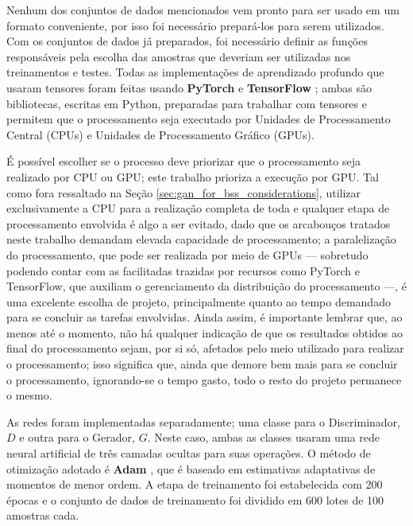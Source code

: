 Nenhum dos conjuntos de dados mencionados vem pronto para ser usado em um formato conveniente, por isso foi necessário prepará-los para serem utilizados. Com os conjuntos de dados já preparados, foi necessário definir as funções responsáveis pela escolha das amostras que deveriam ser utilizadas nos treinamentos e testes. Todas as implementações de aprendizado profundo que usaram tensores foram feitas usando \textbf{PyTorch} \citep{paszke2017pytorch} e \textbf{TensorFlow} \citep{abadi2016tensorflow}; ambas são bibliotecas, escritas em Python, preparadas para trabalhar com tensores e permitem que o processamento seja executado por Unidades de Processamento Central (CPUs) e Unidades de Processamento Gráfico (GPUs).

É possível escolher se o processo deve priorizar que o processamento seja realizado por CPU ou GPU; este trabalho prioriza a execução por GPU. Tal como fora ressaltado na Seção \ref{sec:gan_for_bss_considerations}, utilizar exclusivamente a CPU para a realização completa de toda e qualquer etapa de processamento envolvida é algo a ser evitado, dado que os arcabouços tratados neste trabalho demandam elevada capacidade de processamento; a paralelização do processamento, que pode ser realizada por meio de GPUs --- sobretudo podendo contar com as facilitadas trazidas por recursos como PyTorch e TensorFlow, que auxiliam o gerenciamento da distribuição do processamento ---, é uma excelente escolha de projeto, principalmente quanto ao tempo demandado para se concluir as tarefas envolvidas. Ainda assim, é importante lembrar que, ao menos até o momento, não há qualquer indicação de que os resultados obtidos ao final do processamento sejam, por si só, afetados pelo meio utilizado para realizar o processamento; isso significa que, ainda que demore bem mais para se concluir o processamento, ignorando-se o tempo gasto, todo o resto do projeto permanece o mesmo.

As redes foram implementadas separadamente; uma classe para o Discriminador, $D$ e outra para o Gerador, $G$. Neste caso, ambas as classes usaram uma rede neural artificial de três camadas ocultas para suas operações. O método de otimização adotado é \textbf{Adam} \citep{kingma2014adam}, que é baseado em estimativas adaptativas de momentos de menor ordem. A etapa de treinamento foi estabelecida com 200 épocas e o conjunto de dados de treinamento foi dividido em 600 lotes de 100 amostras cada.

